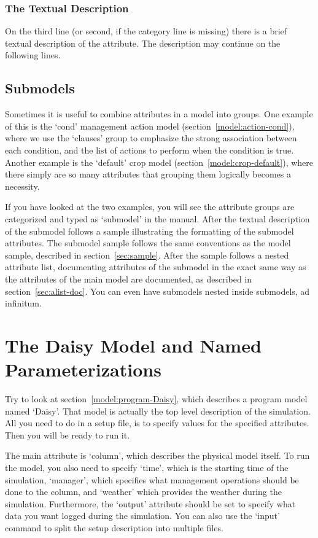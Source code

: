 \subsubsection{The Textual Description}

On the third line (or second, if the category line is missing) there
is a brief textual description of the attribute.  The description may
continue on the following lines.

\subsection{Submodels}

Sometimes it is useful to combine attributes in a model into groups.
One example of this is the `cond' management action model
(section~\ref{model:action-cond}), where we use the `clauses' group to
emphasize the strong association between each condition, and the list
of actions to perform when the condition is true.  Another example is
the `default' crop model (section~\ref{model:crop-default}), where
there simply are so many attributes that grouping them logically
becomes a necessity.

If you have looked at the two examples, you will see the attribute
groups are categorized and typed as `submodel' in the manual.  After
the textual description of the submodel follows a sample illustrating
the formatting of the submodel attributes.  The submodel sample
follows the same conventions as the model sample, described in
section~\ref{sec:sample}.  After the sample follows a nested attribute
list, documenting attributes of the submodel in the exact same way as
the attributes of the main model are documented, as described in
section~\ref{sec:alist-doc}.  You can even have submodels nested
inside submodels, ad infinitum.

\section{The Daisy Model and Named Parameterizations}
\label{sec:daisy}

Try to look at section~\ref{model:program-Daisy}, which describes a program
model named `Daisy'.  That model is actually the top level description
of the simulation.  All you need to do in a setup file, is to specify
values for the specified attributes.  Then you will be ready to run
it.

The main attribute is `column', which describes the physical model
itself.  To run the model, you also need to specify `time', which is
the starting time of the simulation, `manager', which specifies what
management operations should be done to the column, and `weather'
which provides the weather during the simulation.  Furthermore, the
`output' attribute should be set to specify what data you want logged
during the simulation.  You can also use the `input' command to split
the setup description into multiple files. 

